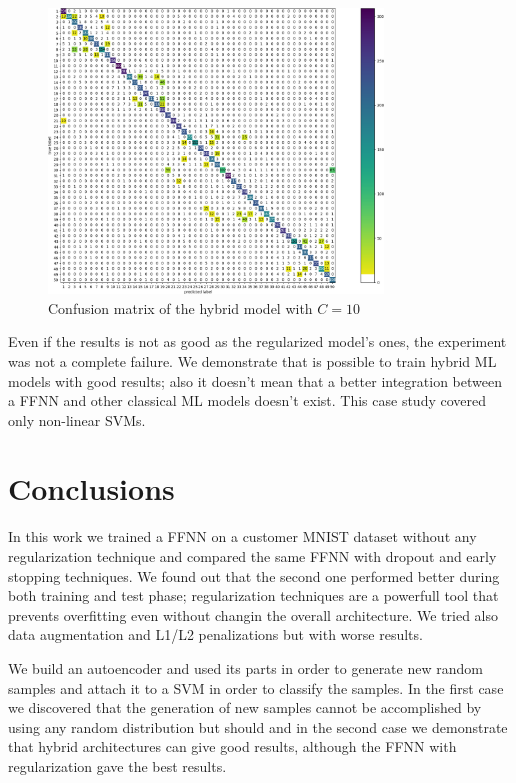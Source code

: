 \documentclass[compsoc]{IEEEtran}
\begin{document}
\begin{figure}[ht!]
\centering                                                                        
\includegraphics[width=3.5in]{c10.png}
\captionsetup{justification=centering}                                                                                       
\caption{Confusion matrix of the hybrid model with $C=10$}
\label{fig:c10}
\end{figure}

Even if the results is not as good as the regularized model's ones, the experiment was not a complete failure. We demonstrate that is possible to train hybrid ML models with good results; also it doesn't mean that a better integration between a FFNN and other classical ML models doesn't exist. This case study covered only non-linear SVMs.

\section{Conclusions}
In this work we trained a FFNN on a customer MNIST dataset without any regularization technique and compared the same FFNN with dropout and early stopping techniques. We found out that the second one performed better during both training and test phase; regularization techniques are a powerfull tool that
prevents overfitting even without changin the overall architecture. We tried also data augmentation and L1/L2 penalizations but with worse results. \par
We build an autoencoder and used its parts in order to generate new random samples and attach it to a SVM in order to classify the samples. In the first
case we discovered that the generation of new samples cannot be accomplished by using any random distribution but should and in the second case we demonstrate that
hybrid architectures can give good results, although the FFNN with regularization gave the best results.
\end{document}
